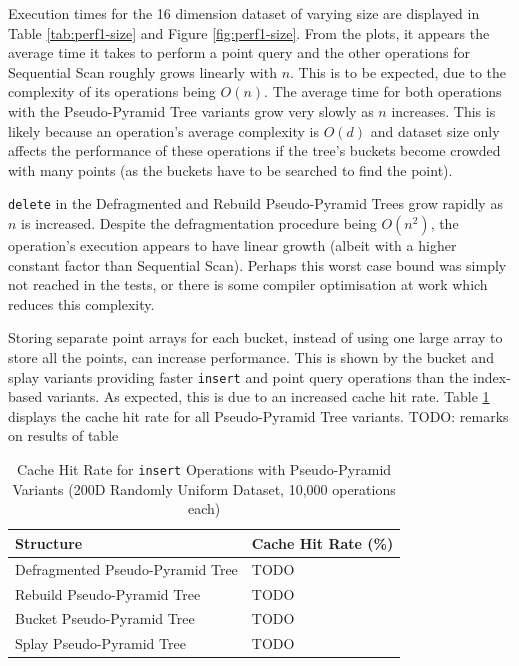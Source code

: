 Execution times for the 16 dimension dataset of varying size are displayed in Table \ref{tab:perf1-size} and Figure \ref{fig:perf1-size}. From the plots, it appears the average time it takes to perform a point query and the other operations for Sequential Scan roughly grows linearly with $n$. This is to be expected, due to the complexity of its operations being $O(n)$. The average time for both operations with the Pseudo-Pyramid Tree variants grow very slowly as $n$ increases. This is likely because an operation's average complexity is $O(d)$ and dataset size only affects the performance of these operations if the tree's buckets become crowded with many points (as the buckets have to be searched to find the point).

\texttt{delete} in the Defragmented and Rebuild Pseudo-Pyramid Trees grow rapidly as $n$ is increased. Despite the defragmentation procedure being $O(n^2)$, the operation's execution appears to have linear growth (albeit with a higher constant factor than Sequential Scan). Perhaps this worst case bound was simply not reached in the tests, or there is some compiler optimisation at work which reduces this complexity.

Storing separate point arrays for each bucket, instead of using one large array to store all the points, can increase performance. This is shown by the bucket and splay variants providing faster \texttt{insert} and point query operations than the index-based variants. As expected, this is due to an increased cache hit rate. Table \ref{tab:perf1-cache-hit-rate} displays the cache hit rate for all Pseudo-Pyramid Tree variants. TODO: remarks on results of table

\begin{table}
	\centering
	\begin{tabular}{|l|l|}
		\hline
		\textbf{Structure} & \textbf{Cache Hit Rate (\%)} \\
		\hline
		Defragmented Pseudo-Pyramid Tree & TODO \\
		Rebuild Pseudo-Pyramid Tree & TODO \\
		Bucket Pseudo-Pyramid Tree & TODO \\
		Splay Pseudo-Pyramid Tree & TODO \\
		\hline
	\end{tabular}
	\caption{Cache Hit Rate for \texttt{insert} Operations with Pseudo-Pyramid Variants (200D Randomly Uniform Dataset, 10,000 operations each)}
	\label{tab:perf1-cache-hit-rate}
\end{table}

